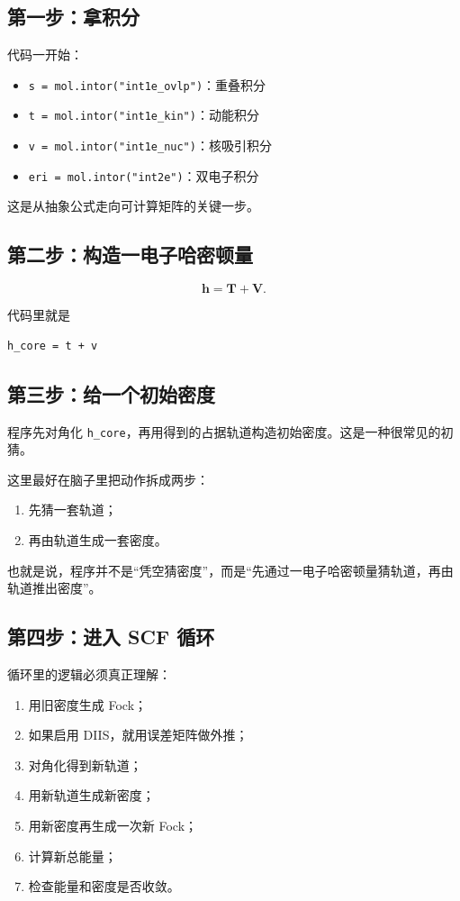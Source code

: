 \documentclass[UTF8,11pt,fontset=fandol]{ctexbook}
\begin{document}
\subsection*{第一步：拿积分}

代码一开始：
\begin{itemize}
  \item \texttt{s = mol.intor("int1e\_ovlp")}：重叠积分
  \item \texttt{t = mol.intor("int1e\_kin")}：动能积分
  \item \texttt{v = mol.intor("int1e\_nuc")}：核吸引积分
  \item \texttt{eri = mol.intor("int2e")}：双电子积分
\end{itemize}

这是从抽象公式走向可计算矩阵的关键一步。

\subsection*{第二步：构造一电子哈密顿量}

\begin{equation}
\mathbf{h} = \mathbf{T} + \mathbf{V}.
\end{equation}

代码里就是
\begin{lstlisting}[style=pythonstyle]
h_core = t + v
\end{lstlisting}

\subsection*{第三步：给一个初始密度}

程序先对角化 \texttt{h\_core}，再用得到的占据轨道构造初始密度。这是一种很常见的初猜。

这里最好在脑子里把动作拆成两步：
\begin{enumerate}[label=\arabic*.]
  \item 先猜一套轨道；
  \item 再由轨道生成一套密度。
\end{enumerate}

也就是说，程序并不是“凭空猜密度”，而是“先通过一电子哈密顿量猜轨道，再由轨道推出密度”。

\subsection*{第四步：进入 SCF 循环}

循环里的逻辑必须真正理解：
\begin{enumerate}[label=\arabic*.]
  \item 用旧密度生成 Fock；
  \item 如果启用 DIIS，就用误差矩阵做外推；
  \item 对角化得到新轨道；
  \item 用新轨道生成新密度；
  \item 用新密度再生成一次新 Fock；
  \item 计算新总能量；
  \item 检查能量和密度是否收敛。
\end{enumerate}
\end{document}
